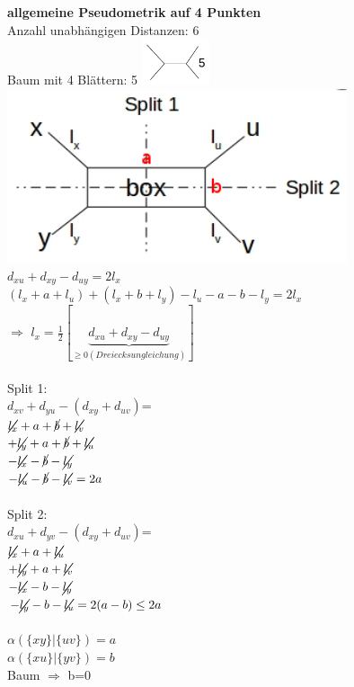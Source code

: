 \textbf{allgemeine Pseudometrik auf 4 Punkten}\\
Anzahl unabhängigen Distanzen: 6\\
Baum mit 4 Blättern: 5
\includegraphics[width=0.15\textwidth]{lectures/161216/pix/4.jpg}\\
\includegraphics[width=0.75\textwidth]{lectures/161216/pix/5.jpg}\\
$d_{xu} + d_{xy} - d_{uy} = 2l_x$\\
$(l_x+a+l_u)+(l_x+b+l_y)-l_u-a-b-l_y=2l_x$\\
$\Rightarrow$ $l_x=\frac{1}{2}[\underbrace{d_{xu}+d_{xy}-d_{uy}}_{\geq 0 (Dreiecksungleichung)}]$\\\\
Split 1:\\
$d_{xv}+d_{yu}-(d_{xy}+d_{uv})$=\\
$\cancel{l_x}+a+\cancel{b}+\cancel{l_v}$\\
$+\cancel{l_y}+a+\cancel{b}+\cancel{l_u}$\\
$-\cancel{l_x}-\cancel{b}-\cancel{l_y}$\\
$-\cancel{l_u}-\cancel{b}-\cancel{l_v}=2a$\\\\
Split 2:\\
$d_{xu}+d_{yv}-(d_{xy}+d_{uv})$=\\
$\cancel{l_x}+a+\cancel{l_u}$\\
$+\cancel{l_y}+a+\cancel{l_v}$\\
$-\cancel{l_x}-b-\cancel{l_y}$\\
$-\cancel{l_y}-b-\cancel{l_u}=2(a-b) \leq 2a$\\\\

$\alpha(\{xy\}|\{uv\})=a$\\
$\alpha(\{xu\}|\{yv\})=b$\\
Baum $\Rightarrow$ b=0

